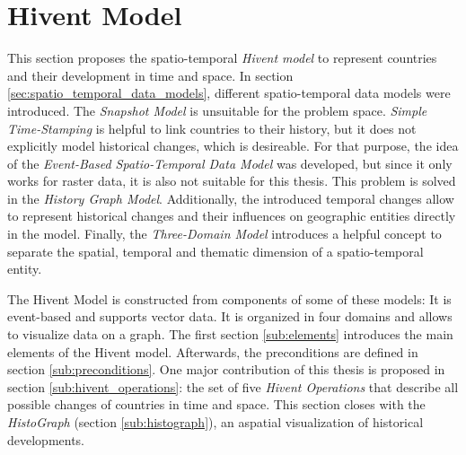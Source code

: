

\section{Hivent Model} %
\label{sec:hivent_model}

This section proposes the spatio-temporal \emph{Hivent model} to represent countries and their development in time and space. In section \ref{sec:spatio_temporal_data_models}, different spatio-temporal data models were introduced. The \emph{Snapshot Model} is unsuitable for the problem space. \emph{Simple Time-Stamping} is helpful to link countries to their history, but it does not explicitly model historical changes, which is desireable. For that purpose, the idea of the \emph{Event-Based Spatio-Temporal Data Model} was developed, but since it only works for raster data, it is also not suitable for this thesis. This problem is solved in the \emph{History Graph Model}. Additionally, the introduced temporal changes allow to represent historical changes and their influences on geographic entities directly in the model. Finally, the \emph{Three-Domain Model} introduces a helpful concept to separate the spatial, temporal and thematic dimension of a spatio-temporal entity.

The Hivent Model is constructed from components of some of these models: It is event-based and supports vector data. It is organized in four domains and allows to visualize data on a graph. The first section \ref{sub:elements} introduces the main elements of the Hivent model. Afterwards, the preconditions are defined in section \ref{sub:preconditions}. One major contribution of this thesis is proposed in section \ref{sub:hivent_operations}: the set of five \emph{Hivent Operations} that describe all possible changes of countries in time and space. This section closes with the \emph{HistoGraph} (section \ref{sub:histograph}), an aspatial visualization of historical developments.

